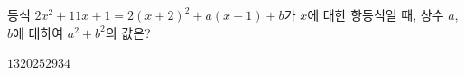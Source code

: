 등식 $2x^2+11x+1=2(x+2)^2+a(x-1)+b$가 $x$에 대한 항등식일 때, 상수 $a$, $b$에 대하여 $a^2+b^2$의 값은?
\begin{choices32}{$13$}{$20$}{$25$}{$29$}{$34$}\end{choices32}
